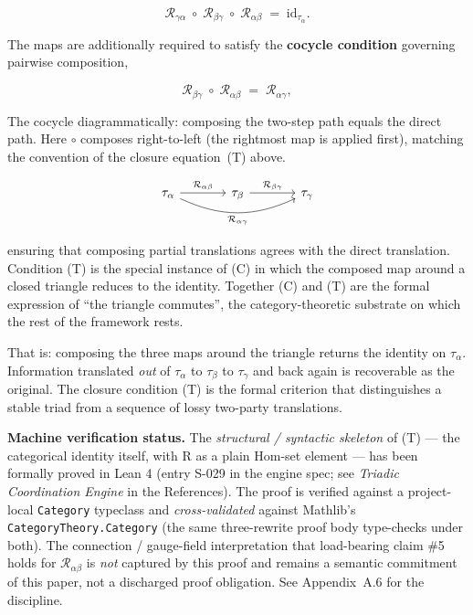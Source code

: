 \documentclass[
]{article}
\begin{document}
\[
\mathcal{R}_{\gamma\alpha} \;\circ\; \mathcal{R}_{\beta\gamma} \;\circ\; \mathcal{R}_{\alpha\beta} \;=\; \mathrm{id}_{\tau_\alpha}. \tag{T}
\]

The maps are additionally required to satisfy the \textbf{cocycle
condition} governing pairwise composition,

\[
\mathcal{R}_{\beta\gamma} \;\circ\; \mathcal{R}_{\alpha\beta} \;=\; \mathcal{R}_{\alpha\gamma}, \tag{C}
\]

The cocycle diagrammatically: composing the two-step path equals the
direct path. Here $\circ$ composes right-to-left (the rightmost map is
applied first), matching the convention of the closure equation~(T) above.

\[
\begin{tikzcd}[column sep=large, row sep=large]
\tau_\alpha \arrow[r, "\mathcal{R}_{\alpha\beta}"] \arrow[rr, bend right=25, "\mathcal{R}_{\alpha\gamma}"'] & \tau_\beta \arrow[r, "\mathcal{R}_{\beta\gamma}"] & \tau_\gamma
\end{tikzcd}
\]

ensuring that composing partial translations agrees with the direct
translation. Condition (T) is the special instance of (C) in which the
composed map around a closed triangle reduces to the identity. Together
(C) and (T) are the formal expression of ``the triangle commutes'', the
category-theoretic substrate on which the rest of the framework rests.

That is: composing the three maps around the triangle returns the
identity on \(\tau_\alpha\). Information translated \emph{out} of
\(\tau_\alpha\) to \(\tau_\beta\) to \(\tau_\gamma\) and back again is
recoverable as the original. The closure condition (T) is the formal
criterion that distinguishes a stable triad from a sequence of lossy
two-party translations.

\textbf{Machine verification status.} The \emph{structural / syntactic
skeleton} of (T) --- the categorical identity itself, with R as a
plain Hom-set element --- has been formally proved in Lean 4 (entry
S-029 in the engine spec; see \emph{Triadic Coordination Engine} in
the References). The proof is verified against a project-local
\texttt{Category} typeclass and \emph{cross-validated} against
Mathlib's \texttt{CategoryTheory.Category} (the same three-rewrite
proof body type-checks under both). The connection / gauge-field
interpretation that load-bearing claim \#5 holds for
\(\mathcal{R}_{\alpha\beta}\) is \emph{not} captured by this proof
and remains a semantic commitment of this paper, not a discharged
proof obligation. See Appendix~A.6 for the discipline.
\end{document}

